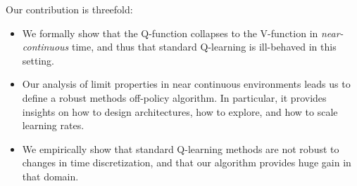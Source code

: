 Our contribution is threefold:
\begin{itemize} 
\item We formally show that the Q-function collapses to the V-function in \emph{near-continuous} time, and thus that
    standard Q-learning is ill-behaved in this setting.
  \item Our analysis of limit properties in near continuous environments leads us to define a robust methods off-policy algorithm. In particular,
    it provides insights on how to design architectures, how to explore, and how to scale learning rates.
  \item We empirically show that standard Q-learning methods are not robust to changes in time discretization, and that our algorithm provides huge gain in that domain.
\end{itemize}


